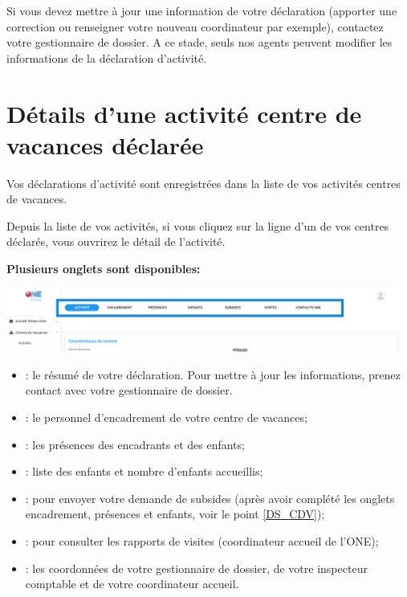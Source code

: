Si vous devez mettre à jour une information de votre déclaration (apporter une correction ou renseigner votre nouveau coordinateur par exemple), contactez votre gestionnaire de dossier. A ce stade, seuls nos agents peuvent modifier les informations de la déclaration d'activité. 
\section{Détails d'une activité centre de vacances déclarée}

Vos déclarations d'activité sont enregistrées dans la liste de vos activités centres de vacances. 

Depuis la liste de vos activités, si vous cliquez sur la ligne d'un de vos centres déclarés, vous ouvrirez le détail de l'activité.

\textbf{Plusieurs onglets sont disponibles:} 

\centerline{\includegraphics[width=13cm]{Images/cdv/cdv-onglets.png}}

\begin{itemize}[label=\textbullet,font=\color{bleu}]
    \item {}: le résumé de votre déclaration. Pour mettre à jour les informations, prenez contact avec votre gestionnaire de dossier. 
    \item {}: le personnel d'encadrement de votre centre de vacances;
    \item {}: les présences des encadrants et des enfants;
    \item {}: liste des enfants et nombre d'enfants accueillis; 
    \item {}: pour envoyer votre demande de subsides (après avoir complété les onglets encadrement, présences et enfants, voir le point \ref{DS_CDV});
    \item {}: pour consulter les rapports de visites (coordinateur accueil de l'ONE);
    \item {}: les coordonnées de votre gestionnaire de dossier, de votre inspecteur comptable et de votre coordinateur accueil. 
\end{itemize}